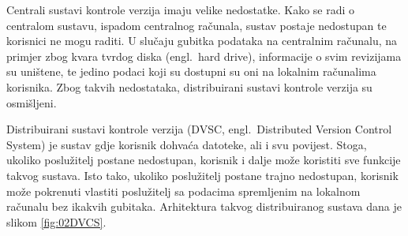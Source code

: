 Centrali sustavi kontrole verzija imaju velike nedostatke. Kako se radi o centralom sustavu, ispadom
centralnog računala, sustav postaje nedostupan te korisnici ne mogu raditi. U slučaju gubitka
podataka na centralnim računalu, na primjer zbog kvara tvrdog diska (engl.~hard drive), informacije o
svim revizijama su uništene, te jedino podaci koji su dostupni su oni na lokalnim računalima
korisnika. Zbog takvih nedostataka, distribuirani sustavi kontrole verzija su osmišljeni.

Distribuirani sustavi kontrole verzija (DVSC, engl.~Distributed Version Control System) je sustav
gdje korisnik dohvaća datoteke, ali i svu povijest. Stoga, ukoliko poslužitelj postane nedostupan,
korisnik i dalje može koristiti sve funkcije takvog sustava. Isto tako, ukoliko poslužitelj postane
trajno nedostupan, korisnik može pokrenuti vlastiti poslužitelj sa podacima spremljenim na lokalnom
računalu bez ikakvih gubitaka. Arhitektura takvog distribuiranog sustava dana je slikom
\ref{fig:02DVCS}.

